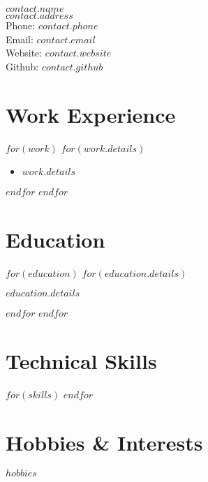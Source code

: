\documentclass{cv-class}
\begin{document}
{\LARGE $contact.name$}\vspace{3px}\\
$contact.address$\\
Phone: $contact.phone$\\
Email: $contact.email$\\
Website: $contact.website$\\
Github: $contact.github$

\section*{Work Experience}
$for(work)$
$for(work.details)$
\begin{itemize}
  \item $work.details$
\end{itemize}
$endfor$
$endfor$

\section*{Education}
$for(education)$
$for(education.details)$
\begin{educationitem}
  \item $education.details$
\end{educationitem}
$endfor$
$endfor$

\section*{Technical Skills}
$for(skills)$
$endfor$

\section*{Hobbies \& Interests}
$hobbies$
\end{document}
